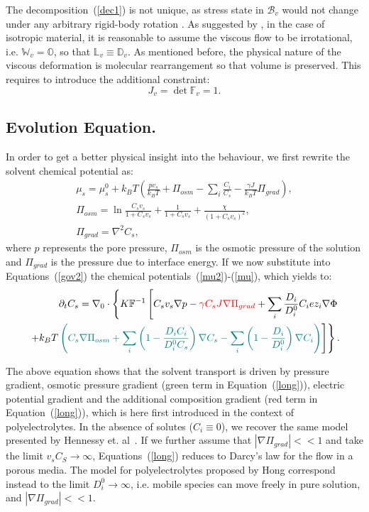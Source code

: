 \documentclass[runningheads]{llncs}
\newcommand{\F}{\ensuremath{\mathbb{F}}}
\newcommand{\LL}{\ensuremath{\mathbb{L}}}
\begin{document}
The decomposition~(\ref{dec1}) is not unique, as stress state in $\mathcal{B}_v$ would not change under any arbitrary rigid-body rotation \cite{multdec}. As suggested by \cite{Plasto}, in the case of isotropic material, it is reasonable to assume the viscous flow to be irrotational, i.e. $\mathbb{W}_v=\mathbb{O}$, so that $\LL_v \equiv \mathbb{D}_v$.
As mentioned before, the physical nature of the viscous deformation is molecular rearrangement so that volume is preserved. This requires to introduce the additional constraint:
\begin{equation}
J_v=\det \F_v= 1.\label{Jv}
\end{equation}



\subsection{Evolution Equation.}

In order to get a better physical insight into the behaviour, we first rewrite the solvent chemical potential as:
\begin{gather}
\mu_s = \mu^0_s + k_B T \left(\frac{p v_s}{k_BT} +\Pi_{osm}-\sum_i \frac{C_i}{C_s} -\frac{\gamma J}{k_B T}\Pi_{grad}\right)\label{mu2},\\
\Pi_{osm}=\ln \frac{C_s v_s}{1+C_s v_s} + \frac{1}{1+C_sv_s}+\frac{\chi}{(1+C_s v_s)^2},\\
\Pi_{grad} = \nabla^2 C_s,
\end{gather}
where $p$ represents the pore pressure, $\Pi_{osm}$ is the osmotic pressure of the solution and $\Pi_{grad}$ is the pressure due to interface energy. If we now substitute into Equations~(\ref{gov2}) the chemical potentials~(\ref{mu2})-(\ref{mu}), which yields to:
\begin{equation}
\begin{aligned}
\partial_t C_s=\nabla_0 \cdot\left\{K\F^{-1}\left[C_s v_s\nabla p - \color{red}\gamma C_s J\nabla \Pi_{grad}\color{black}+\sum_i \frac{D_i}{D^0_i} C_i e z_i \nabla \Phi\right.\right.\\
\left.\left.+ k_B T\color{teal} \left(C_s \nabla \Pi_{osm}+ \sum_i\left(1-\frac{D_iC_i}{D^0_iC_s}\right) \nabla C_s - \sum_i\left(1-\frac{D_i}{D^0_i}\right) \nabla C_i \right)\color{black}\right]\right\}.\label{long}
\end{aligned}
\end{equation}

The above equation shows that the solvent transport is driven by pressure gradient, osmotic pressure gradient (green term in Equation~(\ref{long})), electric potential gradient and the additional composition gradient (red term in Equation~(\ref{long})), which is here first introduced in the context of polyelectrolytes. In the absence of solutes ($C_i\equiv 0$), we recover the same model presented by Hennessy et. al~\cite{sarah}. If we further assume that $|\nabla \Pi_{grad}|<<1$ and take the limit $v_sC_S\rightarrow\infty$, Equations~(\ref{long}) reduces to Darcy's law for the flow in a porous media. The model for polyelectrolytes proposed by Hong \cite{Reviewpolyel} correspond instead to the limit $D^0_i\rightarrow\infty$, i.e. mobile species can move freely in pure solution, and  $|\nabla \Pi_{grad}|<<1$.
\end{document}
